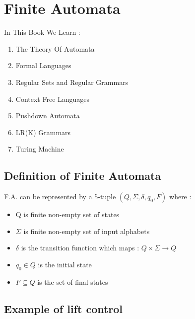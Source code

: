 \documentclass[12pt]{book}
\begin{document}
\tableofcontents

\chapter{Finite Automata}

In This Book We Learn :

\begin{enumerate}
	\item The Theory Of Automata
	\item Formal Languages
	\item Regular Sets and Regular Grammars
	\item Context Free Languages
	\item Pushdown Automata
	\item LR(K) Grammars
	\item Turing Machine
\end{enumerate}


\section{Definition of Finite Automata}

F.A. can be represented by a 5-tuple $(Q,\Sigma,\delta,q_{0},F)$ where :

\begin{itemize}
	\item Q is finite non-empty set of states
	\item $\Sigma$ is finite non-empty set of input alphabets
	\item $\delta$ is the transition function which maps : $Q \times \Sigma \to Q$
	\item $q_{0} \in Q$ is the initial state 
	\item $F \subseteq Q$ is the set of final states
\end{itemize}


\section{Example of lift control}


\end{document}
